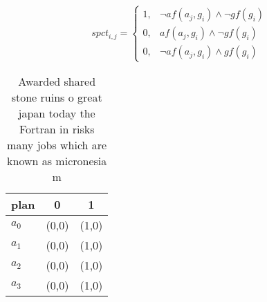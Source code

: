 \documentclass[a4paper]{article}
\begin{document}
\begin{equation}
spct_{i,j} =
\begin{cases}
1, & \text{$\neg af(a_j,g_i) \wedge \neg gf(g_i)$}\\
0, & \text{$af(a_j,g_i) \wedge \neg gf(g_i)$}\\
0, & \text{$\neg af(a_j,g_i) \wedge gf(g_i)$}
\end{cases}
\end{equation}

\begin{table}
\begin{adjustbox}{width=0.9\columnwidth}
\begin{tabular}{|l|l|l|}
\hline
\textbf{plan} & \multicolumn{1}{c|}{\textbf{0}} & \multicolumn{1}{c|}{\textbf{1}} \\ \hline
\textbf{$a_0$}  & (0,0) & (1,0) \\ \hline
\textbf{$a_1$}  & (0,0) & (1,0) \\ \hline
\textbf{$a_2$}  & (0,0) & (1,0) \\ \hline
\textbf{$a_3$}  & (0,0) & (1,0) \\ \hline
\end{tabular}
\end{adjustbox}
\caption{Awarded shared stone ruins o great japan today the Fortran in risks many jobs which are known as micronesia m
}
\end{table}
\end{document}
